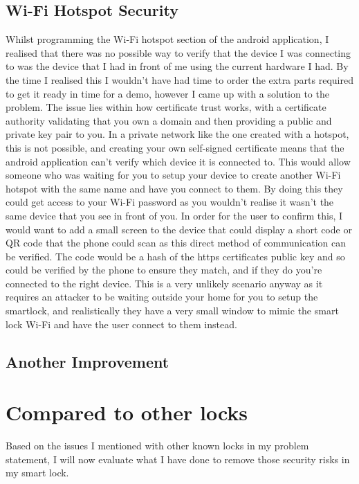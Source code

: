 \subsection{Wi-Fi Hotspot Security}
Whilst programming the Wi-Fi hotspot section of the android application, I realised that there was no possible way to verify that the device I was connecting to was the device that I had in front of me using the current hardware I had. By the time I realised this I wouldn't have had time to order the extra parts required to get it ready in time for a demo, however I came up with a solution to the problem. The issue lies within how certificate trust works, with a certificate authority validating that you own a domain and then providing a public and private key pair to you. In a private network like the one created with a hotspot, this is not possible, and creating your own self-signed certificate means that the android application can't verify which device it is connected to. This would allow someone who was waiting for you to setup your device to create another Wi-Fi hotspot with the same name and have you connect to them. By doing this they could get access to your Wi-Fi password as you wouldn't realise it wasn't the same device that you see in front of you. In order for the user to confirm this, I would want to add a small screen to the device that could display a short code or QR code that the phone could scan as this direct method of communication can be verified. The code would be a hash of the https certificates public key and so could be verified by the phone to ensure they match, and if they do you're connected to the right device. This is a very unlikely scenario anyway as it requires an attacker to be waiting outside your home for you to setup the smartlock, and realistically they have a very small window to mimic the smart lock Wi-Fi and have the user connect to them instead.

\subsection{Another Improvement}

\section{Compared to other locks}
Based on the issues I mentioned with other known locks in my problem statement, I will now evaluate what I have done to remove those security risks in my smart lock.

